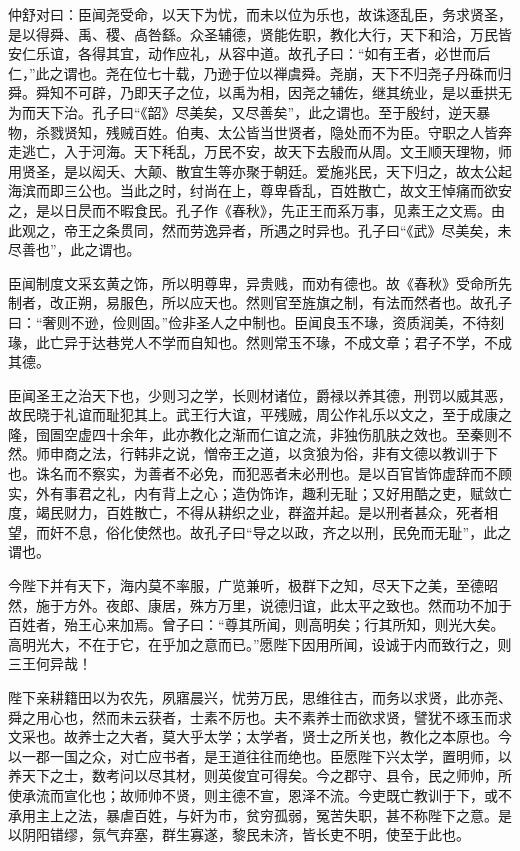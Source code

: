 \documentclass[12pt,UTF8]{ctexbook}
\begin{document}
仲舒对曰：臣闻尧受命，以天下为忧，而未以位为乐也，故诛逐乱臣，务求贤圣，是以得舜、禹、稷、卨咎繇。众圣辅德，贤能佐职，教化大行，天下和洽，万民皆安仁乐谊，各得其宜，动作应礼，从容中道。故孔子曰：“如有王者，必世而后仁，”此之谓也。尧在位七十载，乃逊于位以禅虞舜。尧崩，天下不归尧子丹硃而归舜。舜知不可辟，乃即天子之位，以禹为相，因尧之辅佐，继其统业，是以垂拱无为而天下治。孔子曰“《韶》尽美矣，又尽善矣”，此之谓也。至于殷纣，逆天暴物，杀戮贤知，残贼百姓。伯夷、太公皆当世贤者，隐处而不为臣。守职之人皆奔走逃亡，入于河海。天下秏乱，万民不安，故天下去殷而从周。文王顺天理物，师用贤圣，是以闳夭、大颠、散宜生等亦聚于朝廷。爱施兆民，天下归之，故太公起海滨而即三公也。当此之时，纣尚在上，尊卑昏乱，百姓散亡，故文王悼痛而欲安之，是以日昃而不暇食民。孔子作《春秋》，先正王而系万事，见素王之文焉。由此观之，帝王之条贯同，然而劳逸异者，所遇之时异也。孔子曰“《武》尽美矣，未尽善也”，此之谓也。



臣闻制度文采玄黄之饰，所以明尊卑，异贵贱，而劝有德也。故《春秋》受命所先制者，改正朔，易服色，所以应天也。然则官至旌旗之制，有法而然者也。故孔子曰：“奢则不逊，俭则固。”俭非圣人之中制也。臣闻良玉不瑑，资质润美，不待刻瑑，此亡异于达巷党人不学而自知也。然则常玉不瑑，不成文章；君子不学，不成其德。



臣闻圣王之治天下也，少则习之学，长则材诸位，爵禄以养其德，刑罚以威其恶，故民晓于礼谊而耻犯其上。武王行大谊，平残贼，周公作礼乐以文之，至于成康之隆，囹圄空虚四十余年，此亦教化之渐而仁谊之流，非独伤肌肤之效也。至秦则不然。师申商之法，行韩非之说，憎帝王之道，以贪狼为俗，非有文德以教训于下也。诛名而不察实，为善者不必免，而犯恶者未必刑也。是以百官皆饰虚辞而不顾实，外有事君之礼，内有背上之心；造伪饰诈，趣利无耻；又好用酷之吏，赋敛亡度，竭民财力，百姓散亡，不得从耕织之业，群盗并起。是以刑者甚众，死者相望，而奸不息，俗化使然也。故孔子曰“导之以政，齐之以刑，民免而无耻”，此之谓也。



今陛下并有天下，海内莫不率服，广览兼听，极群下之知，尽天下之美，至德昭然，施于方外。夜郎、康居，殊方万里，说德归谊，此太平之致也。然而功不加于百姓者，殆王心来加焉。曾子曰：“尊其所闻，则高明矣；行其所知，则光大矣。高明光大，不在于它，在乎加之意而已。”愿陛下因用所闻，设诚于内而致行之，则三王何异哉！



陛下亲耕籍田以为农先，夙寤晨兴，忧劳万民，思维往古，而务以求贤，此亦尧、舜之用心也，然而未云获者，士素不厉也。夫不素养士而欲求贤，譬犹不琢玉而求文采也。故养士之大者，莫大乎太学；太学者，贤士之所关也，教化之本原也。今以一郡一国之众，对亡应书者，是王道往往而绝也。臣愿陛下兴太学，置明师，以养天下之士，数考问以尽其材，则英俊宜可得矣。今之郡守、县令，民之师帅，所使承流而宣化也；故师帅不贤，则主德不宣，恩泽不流。今吏既亡教训于下，或不承用主上之法，暴虐百姓，与奸为市，贫穷孤弱，冤苦失职，甚不称陛下之意。是以阴阳错缪，氛气弃塞，群生寡遂，黎民未济，皆长吏不明，使至于此也。
\end{document}
